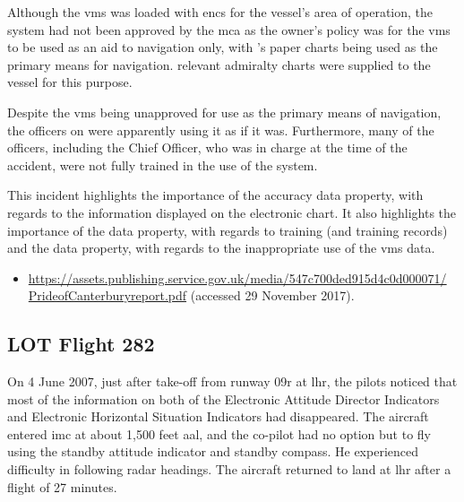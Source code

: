 Although the \gls{vms} was loaded with \glspl{enc} for the vessel's area of operation, the system had not been approved by the \gls{mca} as the owner's policy was for the \gls{vms} to be used as an aid to navigation only, with 's paper charts being used as the primary means for navigation. relevant admiralty charts were supplied to the vessel for this purpose.

Despite the \gls{vms} being unapproved for use as the primary means of navigation, the officers on  were apparently using it as if it was. Furthermore, many of the officers, including the Chief Officer, who was in charge at the time of the accident, were not fully trained in the use of the system.

This incident highlights the importance of the \gls{accuracy} \gls{data property}, with regards to the \gls{information} displayed on the electronic chart. It also highlights the importance of the  \gls{data property}, with regards to training (and training records) and the  \gls{data property}, with regards to the inappropriate use of the \gls{vms} data.

\begin{samepage}
\begin{itemize}
  \item \raggedright{\href{https://assets.publishing.service.gov.uk/media/547c700ded915d4c0d000071/PrideofCanterburyreport.pdf}{https://assets.publishing.service.gov.uk/media/547c700ded915d4c0d000071/ PrideofCanterburyreport.pdf} (accessed 29 November 2017).}
\end{itemize}
\end{samepage}


\subsection{LOT Flight 282} \label{bkm:incacc:lot282}
On 4 June 2007, just after take-off from runway 09r at \gls{lhr}, the pilots noticed that most of the \gls{information} on both of the Electronic Attitude Director Indicators and Electronic Horizontal Situation Indicators had disappeared. The aircraft entered \gls{imc} at about 1,500 feet \gls{aal}, and the co-pilot had no option but to fly using the standby attitude indicator and standby compass. He experienced difficulty in following radar headings. The aircraft returned to land at \gls{lhr} after a flight of 27 minutes.

